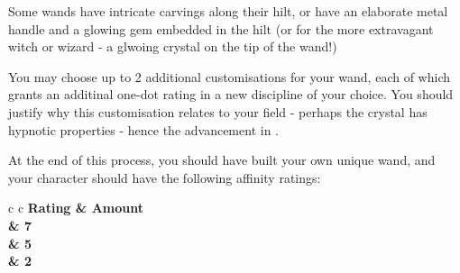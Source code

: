 Some wands have intricate carvings along their hilt, or have an elaborate metal handle and a glowing gem embedded in the hilt (or for the more extravagant witch or wizard - a glwoing crystal on the tip of the wand!)

You may choose up to 2 additional customisations for your wand, each of which grants an additinal one-dot rating in a new discipline of your choice. You should justify why this customisation relates to your field - perhaps the crystal has hypnotic properties - hence the advancement in . 


At the end of this process, you should have built your own unique wand, and your character should have the following affinity ratings:
\begin{center}
	\begin{rndtable}{c c}
	\bf Rating	&	\bf Amount \\
	\emptyCape	&	7 \\
	\oneCape	&	5 \\
	\twoCape	&	2
	\end{rndtable}
\end{center}


